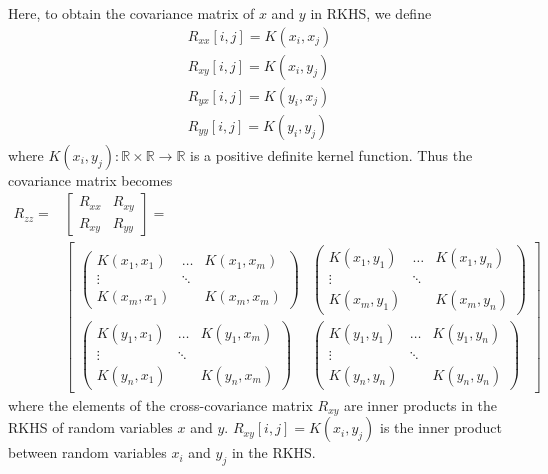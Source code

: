 \documentclass[12pt]{report} %
\begin{document}
Here, to obtain the covariance matrix of $x$ and $y$ in RKHS, we define
\begin{equation}
\begin{split}
R_{xx}[i,j] = K(x_{i},x_{j}) \\
R_{xy}[i,j] = K(x_{i},y_{j}) \\
R_{yx}[i,j] = K(y_{i},x_{j}) \\
R_{yy}[i,j] = K(y_{i},y_{j})
\end{split}
\end{equation}
where $K(x_{i},y_{j}): \mathbb{R} \times \mathbb{R} \to \mathbb{R}$ is a positive definite kernel function. Thus the covariance matrix becomes
\begin{equation}
\begin{split}
R_{zz}={} & \begin{bmatrix}
R_{xx} & R_{xy} \\
R_{xy} & R_{yy}
\end{bmatrix}= \\
& \begin{bmatrix}
\begin{pmatrix}
K(x_{1},x_{1}) & \dots & K(x_{1},x_{m})\\ \vdots & \ddots & \\ K(x_{m},x_{1}) & & K(x_{m},x_{m})
\end{pmatrix} &
\begin{pmatrix}
K(x_{1},y_{1}) & \dots & K(x_{1},y_{n})\\ \vdots & \ddots & \\ K(x_{m},y_{1}) & & K(x_{m},y_{n})
\end{pmatrix} \\
\begin{pmatrix}
K(y_{1},x_{1}) & \dots & K(y_{1},x_{m})\\ \vdots & \ddots & \\ K(y_{n},x_{1}) & & K(y_{n},x_{m})
\end{pmatrix} &
\begin{pmatrix}
K(y_{1},y_{1}) & \dots & K(y_{1},y_{n})\\ \vdots & \ddots & \\ K(y_{n},y_{n}) & & K(y_{n},y_{n})
\end{pmatrix}
\end{bmatrix}
\end{split}
\end{equation}
where the elements of the cross-covariance matrix $R_{xy}$ are inner products in the RKHS of random variables $x$ and $y$. $R_{xy}[i,j]=K(x_{i},y_{j})$ is the inner product between random variables $x_{i}$ and $y_{j}$ in the RKHS. 
\end{document}
